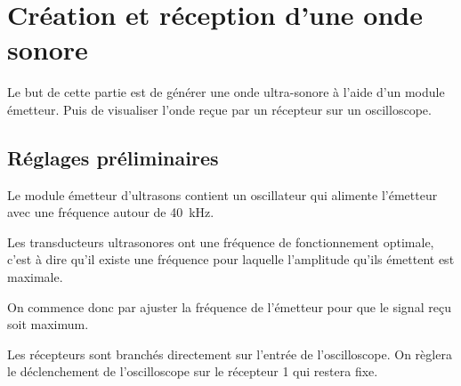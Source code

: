 \documentclass[]{tp}
\begin{document}

\section{Création et réception d'une onde sonore}
Le but de cette partie est de générer une onde ultra-sonore à l'aide d'un module émetteur. Puis de visualiser l'onde reçue par un récepteur sur un oscilloscope.
  \begin{center}
  \end{center}
  
\subsection{Réglages préliminaires}
Le module émetteur d'ultrasons contient un oscillateur qui alimente l'émetteur avec une fréquence autour de \SI{40}{\kilo\hertz}. 

Les transducteurs ultrasonores ont une fréquence de fonctionnement optimale, c'est à dire qu'il existe une fréquence pour laquelle l'amplitude qu'ils émettent est maximale.

On commence donc par ajuster la fréquence de l'émetteur pour que le signal reçu soit maximum.

Les récepteurs sont branchés directement sur l'entrée de l'oscilloscope. On règlera le déclenchement de l'oscilloscope sur le récepteur 1 qui restera fixe.
\end{document}
